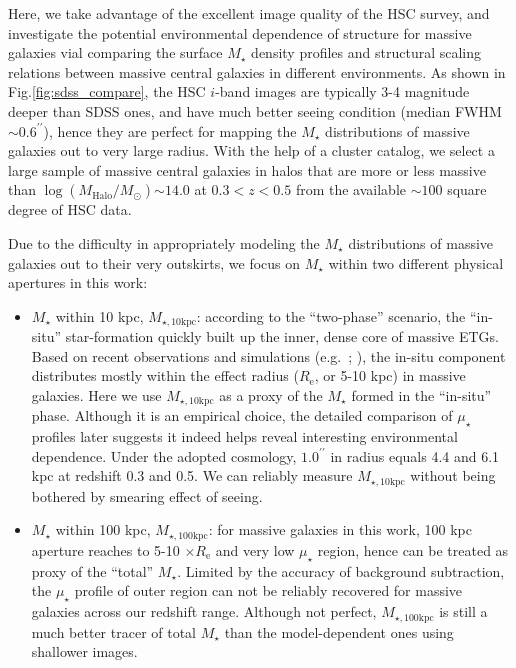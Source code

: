\documentclass{emulateapj}
\def\arcsec{{\prime\prime}}
\def\mstar{{$M_{\star}$}}
\def\logmh{{$\log (M_{\mathrm{Halo}}/M_{\odot})$}}
\def\minn{{$M_{\star,10\mathrm{kpc}}$}}
\def\mtot{{$M_{\star,100\mathrm{kpc}}$}}
\def\mden{{$\mu_{\star}$}}
\newcommand{\update}[1]{\textcolor{Bittersweet}{#1}}
\begin{document}
\begin{CJK*}{UTF8}{gbsn}
    \update{Here, we take advantage of the excellent image quality of the HSC survey, and 
    investigate the potential environmental dependence of structure for massive galaxies 
    vial comparing the surface \mstar{} density profiles and structural scaling relations 
    between massive central galaxies in different environments. 
    As shown in Fig.\ref{fig:sdss_compare}, the HSC $i$-band images are typically 3-4 
    magnitude deeper than SDSS ones, and have much better seeing condition 
    (median FWHM$\sim 0.6^{\arcsec}$), hence they are perfect for mapping the \mstar{}
    distributions of massive galaxies out to very large radius. 
    With the help of a cluster catalog, we select a large sample of massive central 
    galaxies in halos that are more or less massive than \logmh{}$\sim 14.0$ at 
    $0.3 < z < 0.5$ from the available $\sim 100$ square degree of HSC data.}
    
    \update{Due to the difficulty in appropriately modeling the \mstar{} distributions of 
    massive galaxies out to their very outskirts, we focus on \mstar{} within two different 
    physical apertures in this work:}
    
    \begin{itemize}
        \item \update{\mstar{} within 10 kpc, \minn{}: according to the ``two-phase'' 
            scenario, the ``in-situ'' star-formation quickly built up the inner, dense 
            core of massive ETGs.  
            Based on recent observations and simulations (e.g.~\citealt{vanDokkum2010}; 
            \citealt{RodriguezGomez2016}), the in-situ 
            component distributes mostly within the effect radius ($R_{\mathrm{e}}$, 
            or 5-10 kpc) in massive galaxies.  
            Here we use \minn{} as a proxy of the \mstar{} formed in the ``in-situ''
            phase.  Although it is an empirical choice, the detailed comparison of 
            \mden{} profiles later suggests it indeed helps reveal interesting 
            environmental dependence.  
            Under the adopted cosmology, $1.0^{\arcsec}$ in radius equals 4.4 and 6.1 kpc 
            at redshift 0.3 and 0.5.  
            We can reliably measure \minn{} without being bothered by smearing effect
            of seeing.}
        \item \update{\mstar{} within 100 kpc, \mtot{}: for massive galaxies in this work, 
            100 kpc aperture reaches to 5-10 $\times R_{\mathrm{e}}$ and very low 
            \mden{} region, hence can be treated as proxy of the ``total'' \mstar{}. 
            Limited by the accuracy of background subtraction, the \mden{} profile 
            of outer region can not be reliably recovered for massive galaxies across 
            our redshift range. 
            Although not perfect, \mtot{} is still a much better tracer of total 
            \mstar{} than the model-dependent ones using shallower images.}
    \end{itemize}
    

\end{CJK*}
\end{document}
